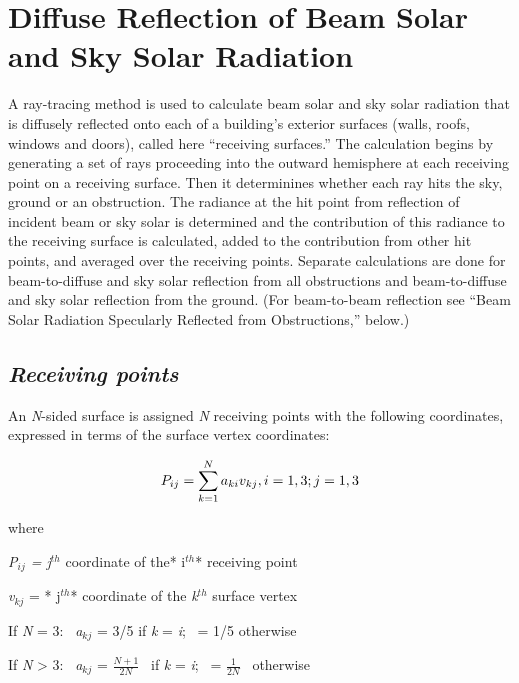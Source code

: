 \section{Diffuse Reflection of Beam Solar and Sky Solar Radiation}\label{diffuse-reflection-of-beam-solar-and-sky-solar-radiation}

A ray-tracing method is used to calculate beam solar and sky solar radiation that is diffusely reflected onto each of a building's exterior surfaces (walls, roofs, windows and doors), called here ``receiving surfaces.'' The calculation begins by generating a set of rays proceeding into the outward hemisphere at each receiving point on a receiving surface. Then it determinines whether each ray hits the sky, ground or an obstruction. The radiance at the hit point from reflection of incident beam or sky solar is determined and the contribution of this radiance to the receiving surface is calculated, added to the contribution from other hit points, and averaged over the receiving points. Separate calculations are done for beam-to-diffuse and sky solar reflection from all obstructions and beam-to-diffuse and sky solar reflection from the ground. (For beam-to-beam reflection see ``Beam Solar Radiation Specularly Reflected from Obstructions,'' below.)

\subsection{\texorpdfstring{\emph{Receiving points}}{Receiving points}}\label{receiving-points}

An \emph{N}-sided surface is assigned \emph{N} receiving points with the following coordinates, expressed in terms of the surface vertex coordinates:

\begin{equation}
{P_{ij}} = \sum\limits_{k = 1}^N {{a_{ki}}{v_{kj}},{\rm{  }}i = 1,3;{\rm{  }}j = 1,3}
\end{equation}

where

\emph{P\(_{ij}\) = j\(^{th}\)} coordinate of the* i\(^{th}\)* receiving point

\emph{v\(_{kj}\)} = * j\(^{th}\)* coordinate of the \emph{k\(^{th}\)} surface vertex

If \emph{N} = 3:~ \emph{a\(_{kj}\)} = 3/5 if \emph{k} = \emph{i};~ = 1/5 otherwise

If \emph{N} \textgreater{} 3:~ \emph{a\(_{kj}\)} = \(\frac{{N + 1}}{{2N}}\) ~if \emph{k} = \emph{i};~ = \(\frac{1}{{2N}}\) ~otherwise

